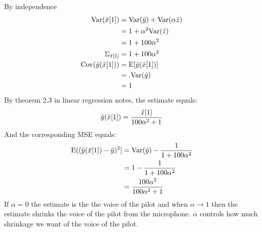 \documentclass[11pt,twoside]{article}
\begin{document}
\begin{exam}
\begin{exercise}
\begin{problem}
\begin{enumerate}
By independence
\begin{align*}
	\var(\rx[1])			&=	\var(\ry) + \var(\alpha \rnd{z}) \\
					&=	1 + \alpha^2	\var(\rnd{z}) \\
					&=	1 + 100 \alpha^2 \\
	\Sigma_{\rx[1]}		&=	1 + 100 \alpha^2 \\
	\Cov({\ry}{(\rx[1])})	&=	\E[ {\ry}{(\rx[1])} ] \\
					&=.  \var({\ry}) \\
					&=	1 \\
\end{align*}
By theorem 2.3 in linear regression notes, the estimate equals:
$$
		\hat{y}(\tilde{  x }[1]) = \frac{\tilde{  x }[1]} {100 \alpha^2 + 1}
$$
And the corresponding MSE equals:
\begin{align*}
	\E( (\hat{y}(\rx[1])  - \ry)^2 ]		&= \var(\ry) - \frac{1} {1 + 100 \alpha^2} \\
								&= 1 - \frac{1} {1 + 100 \alpha^2} \\
								&= \frac{100 \alpha^2}  {100 \alpha^2 + 1} 
\end{align*}
If $\alpha=0$ the estimate is the the voice of the pilot and when $\alpha \rightarrow 1$ then the estimate shrinks the voice of the pilot from the microphone.
$\alpha$ controls how much shrinkage we want of the voice of the pilot.


\end{enumerate}
\end{problem}
\end{exercise}
\end{exam}
\end{document}
